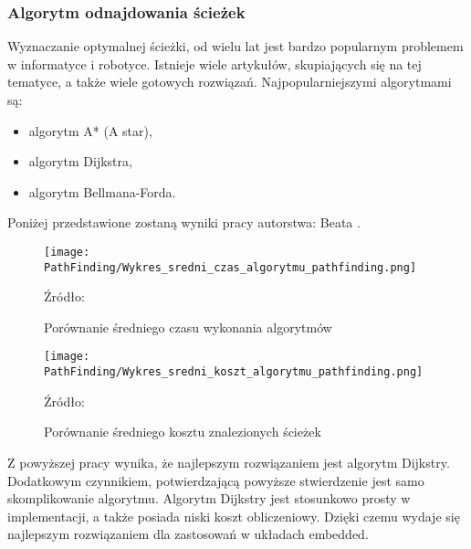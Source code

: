         \subsubsection{Algorytm odnajdowania ścieżek}
        \label{subsec:algorytm_odnajdowania_ścieżek}
            Wyznaczanie optymalnej ścieżki, od wielu lat jest bardzo popularnym problemem w informatyce i robotyce.
            Istnieje wiele artykułów, skupiających się na tej tematyce, a także wiele gotowych rozwiązań.
            Najpopularniejszymi algorytmami są:
            \begin{itemize}
                \item algorytm A* (A star),
                \item algorytm Dijkstra,
                \item algorytm Bellmana-Forda.
            \end{itemize}

            Poniżej przedstawione zostaną wyniki pracy  \cite{AnalizaAlgorytmówŚcieżek}
            autorstwa: Beata \citeauthor{AnalizaAlgorytmówŚcieżek}.
            \begin{figure}[!ht]
                \centering
                \figurePlotName
                \texttt{[image: PathFinding/Wykres\_sredni\_czas\_algorytmu\_pathfinding.png]}
                \caption{Porównanie średniego czasu wykonania algorytmów}
                Źródło:\cite{AnalizaAlgorytmówŚcieżek}  
                \label{fig:PathFindingTime}
            \end{figure}
            \begin{figure}[!ht]
                \centering
                \figurePlotName
                \texttt{[image: PathFinding/Wykres\_sredni\_koszt\_algorytmu\_pathfinding.png]}
                \caption{Porównanie średniego kosztu znalezionych ścieżek}
                Źródło:\cite{AnalizaAlgorytmówŚcieżek} 
                \label{fig:PathFindingCost}
            \end{figure}
            
            Z powyższej pracy wynika, że najlepszym rozwiązaniem jest algorytm Dijkstry.
            Dodatkowym czynnikiem, potwierdzającą powyższe stwierdzenie jest samo skomplikowanie algorytmu.
            Algorytm Dijkstry jest stosunkowo prosty w implementacji, a także posiada niski koszt obliczeniowy.
            Dzięki czemu wydaje się najlepszym rozwiązaniem dla zastosowań w układach embedded.


